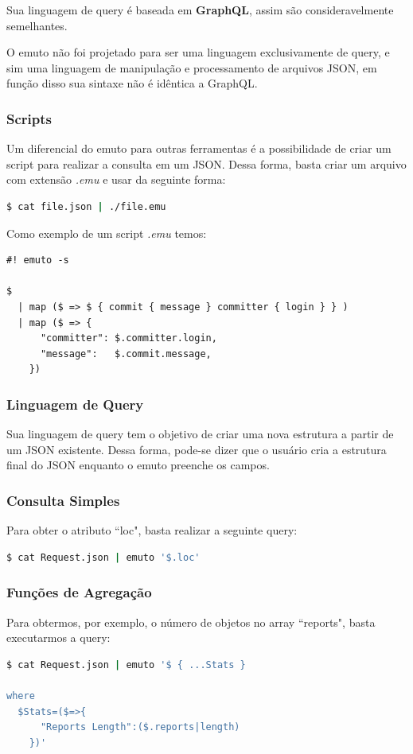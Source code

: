 \documentclass[a4paper, 12pt] {article}
\begin{document}
				Sua linguagem de query é baseada em \textbf{GraphQL}, assim são consideravelmente semelhantes. 

				O emuto não foi projetado para ser uma linguagem exclusivamente de query, e sim uma linguagem de manipulação e processamento de arquivos JSON, em função disso sua sintaxe não é idêntica a GraphQL.
			\subsubsection{Scripts}
				Um diferencial do emuto para outras ferramentas é a possibilidade de criar um script para realizar a consulta em um JSON. Dessa forma, basta criar um arquivo com extensão \textit{.emu} e usar da seguinte forma:
\begin{lstlisting}[language=bash]
$ cat file.json | ./file.emu
\end{lstlisting}

				Como exemplo de um script \textit{.emu} temos:
\begin{lstlisting}
#! emuto -s

$
  | map ($ => $ { commit { message } committer { login } } )
  | map ($ => {
      "committer": $.committer.login,
      "message":   $.commit.message,
    })
\end{lstlisting}
			\subsubsection{Linguagem de Query}
				Sua linguagem de query tem o objetivo de criar uma nova estrutura a partir de um JSON existente. Dessa forma, pode-se dizer que o usuário cria a estrutura final do JSON enquanto o emuto preenche os campos.
			\subsubsection{Consulta Simples}
				Para obter o atributo “loc", basta realizar a seguinte query:
\begin{lstlisting}[language=bash]
$ cat Request.json | emuto '$.loc'
\end{lstlisting}
			\subsubsection{Funções de Agregação}
				Para obtermos, por exemplo, o número de objetos no array “reports", basta executarmos a query:
\begin{lstlisting}[language=bash]
$ cat Request.json | emuto '$ { ...Stats }

where
  $Stats=($=>{
      "Reports Length":($.reports|length)
    })'
\end{lstlisting}
\end{document}
